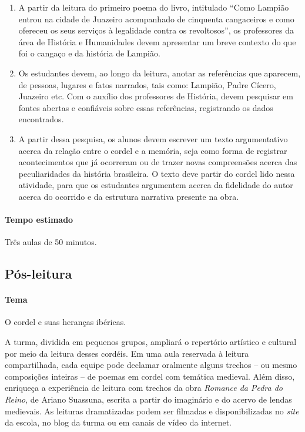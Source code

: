 \documentclass[12pt]{extarticle}
\begin{document}
\begin{enumerate}

\item A partir da leitura do primeiro poema do livro, intitulado ``Como Lampião
  entrou na cidade de Juazeiro acompanhado de cinquenta cangaceiros e como
  ofereceu os seus serviços à legalidade contra os revoltosos'', os professores
  da área de História e Humanidades devem apresentar um breve contexto do que
  foi o cangaço e da história de Lampião.

\item Os estudantes devem, ao longo da leitura, anotar as referências que
  aparecem, de pessoas, lugares e fatos narrados, tais como: Lampião, Padre
  Cícero, Juazeiro etc. Com o auxílio dos professores de História, devem
  pesquisar em fontes abertas e confiáveis sobre essas referências, registrando
  os dados encontrados.

\item A partir dessa pesquisa, os alunos devem escrever um texto argumentativo
  acerca da relação entre o cordel e a memória, seja como forma de registrar
  acontecimentos que já ocorreram ou de trazer novas compreensões acerca das
  peculiaridades da história brasileira. O texto deve partir do cordel lido
  nessa atividade, para que os estudantes argumentem acerca da fidelidade do
  autor acerca do ocorrido e da estrutura narrativa presente na obra.

\end{enumerate}

\paragraph{Tempo estimado} Três aulas de 50 minutos.




\subsection{Pós-leitura}

\paragraph{Tema} O cordel e suas heranças ibéricas.

A turma, dividida em pequenos grupos, ampliará o repertório artístico 
e cultural por meio da leitura desses cordéis. Em uma aula reservada 
à leitura compartilhada, cada equipe pode declamar oralmente alguns trechos 
-- ou mesmo composições inteiras -- de poemas em cordel com temática 
medieval. Além disso, enriqueça a experiência de leitura com trechos da obra 
\emph{Romance da Pedra do Reino}, de Ariano Suassuna, escrita a partir do 
imaginário e do acervo de lendas medievais. As leituras dramatizadas podem 
ser filmadas e disponibilizadas no \emph{site} da escola, no blog da turma ou 
em canais de vídeo da internet.
\end{document}
